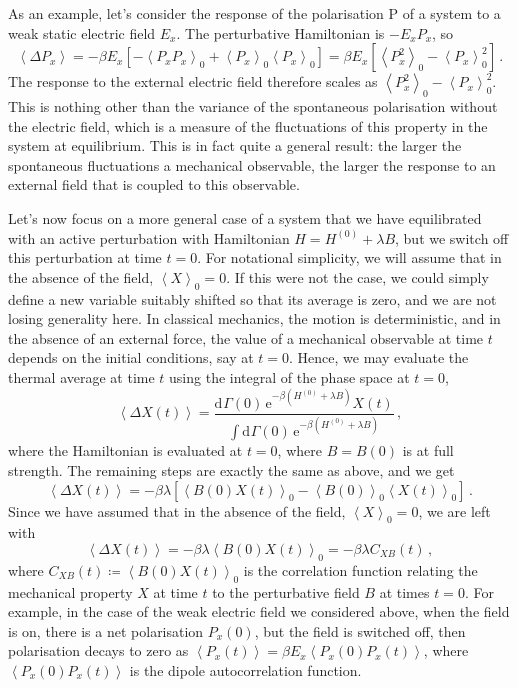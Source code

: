 \documentclass{article}
\theoremstyle{plain}\theoremheaderfont{\normalfont\bfseries}\theorembodyfont{\rmfamily}\theoremseparator{.}\newtheorem*{thm}{Theorem}\newtheorem*{law}{Law}\newtheorem*{pos}{Postulate}
\numberwithin{equation}{section}
\newcommand{\ee}{\mathrm{e}}
\newcommand{\dd}[2][]{\mathrm{d}^{#1} #2\,}
\newcommand{\eval}[1]{\left\langle #1 \right\rangle}
\newcommand{\vb}[1]{\bm{\mathrm{#1}}}
\begin{document}
    As an example, let's consider the response of the polarisation \(\vb{P}\) of a system to a weak static electric field \(E_x\). The perturbative Hamiltonian is \(-E_xP_x\), so
    \begin{equation}
        \eval{\Delta P_x}=-\beta E_x[-\eval{P_xP_x}_0+\eval{P_x}_0\eval{P_x}_0]=\beta E_x[\eval{P_x^2}_0-\eval{P_x}_0^2]\,.
    \end{equation}
    The response to the external electric field therefore scales as \(\eval{P_x^2}_0-\eval{P_x}_0^2\). This is nothing other than the variance of the spontaneous polarisation without the electric field, which is a measure of the fluctuations of this property in the system at equilibrium. This is in fact quite a general result: the larger the spontaneous fluctuations a mechanical observable, the larger the response to an external field that is coupled to this observable.

    Let's now focus on a more general case of a system that we have equilibrated with an active perturbation with Hamiltonian \(H=H^{(0)}+\lambda B\), but we switch off this perturbation at time \(t=0\). For notational simplicity, we will assume that in the absence of the field, \(\eval{X}_0=0\). If this were not the case, we could simply define a new variable suitably shifted so that its average is zero, and we are not losing generality here. In classical mechanics, the motion is deterministic, and in the absence of an external force, the value of a mechanical observable at time \(t\) depends on the initial conditions, say at \(t=0\). Hence, we may evaluate the thermal average at time \(t\) using the integral of the phase space at \(t=0\),
    \begin{equation}
        \eval{\Delta X(t)}=\frac{\dd{\Gamma(0)}\ee^{-\beta(H^{(0)}+\lambda B)}X(t)}{\int\dd{\Gamma(0)}\ee^{-\beta(H^{(0)}+\lambda B)}}\,,
    \end{equation}
    where the Hamiltonian is evaluated at \(t=0\), where \(B=B(0)\) is at full strength. The remaining steps are exactly the same as above, and we get
    \begin{equation}
        \eval{\Delta X(t)}=-\beta\lambda[\eval{B(0)X(t)}_0-\eval{B(0)}_0\eval{X(t)}_0]\,.
    \end{equation}
    Since we have assumed that in the absence of the field, \(\eval{X}_0=0\), we are left with
    \begin{equation}\label{response_per_switched_on}
        \eval{\Delta X(t)}=-\beta\lambda\eval{B(0)X(t)}_0=-\beta\lambda C_{XB}(t)\,,
    \end{equation}
    where \(C_{XB}(t)\coloneqq\eval{B(0)X(t)}_0\) is the correlation function relating the mechanical property \(X\) at time \(t\) to the perturbative field \(B\) at times \(t=0\). For example, in the case of the weak electric field we considered above, when the field is on, there is a net polarisation \(P_x(0)\), but the field is switched off, then polarisation decays to zero as \(\eval{P_x(t)}=\beta E_x\eval{P_x(0)P_x(t)}\), where \(\eval{P_x(0)P_x(t)}\) is the dipole autocorrelation function.
\end{document}
